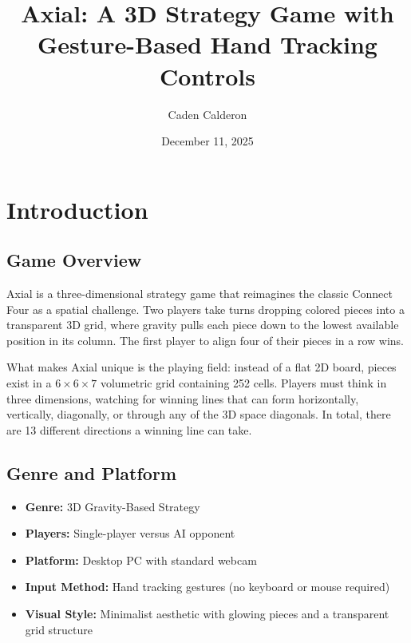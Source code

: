 \documentclass[11pt]{article}
\title{\textbf{Axial: A 3D Strategy Game with \\Gesture-Based Hand Tracking Controls}}
\author{Caden Calderon}
\date{December 11, 2025}
\begin{document}
\maketitle

\section{Introduction}

\subsection{Game Overview}

Axial is a three-dimensional strategy game that reimagines the classic Connect Four as a spatial challenge. Two players take turns dropping colored pieces into a transparent 3D grid, where gravity pulls each piece down to the lowest available position in its column. The first player to align four of their pieces in a row wins.

What makes Axial unique is the playing field: instead of a flat 2D board, pieces exist in a $6 \times 6 \times 7$ volumetric grid containing 252 cells. Players must think in three dimensions, watching for winning lines that can form horizontally, vertically, diagonally, or through any of the 3D space diagonals. In total, there are 13 different directions a winning line can take.


\subsection{Genre and Platform}

\begin{itemize}
    \item \textbf{Genre:} 3D Gravity-Based Strategy
    \item \textbf{Players:} Single-player versus AI opponent
    \item \textbf{Platform:} Desktop PC with standard webcam
    \item \textbf{Input Method:} Hand tracking gestures (no keyboard or mouse required)
    \item \textbf{Visual Style:} Minimalist aesthetic with glowing pieces and a transparent grid structure
\end{itemize}
\end{document}
